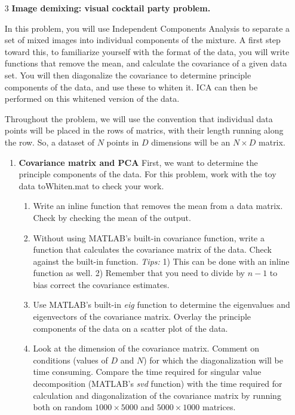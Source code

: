 \documentclass{article}
\begin{document}
\begin{itemize}
\item[3] \textbf{Image demixing: visual cocktail party problem. }

In this problem, you will use Independent Components Analysis to separate a set of mixed images into individual components of the mixture. A first step toward this, to familiarize yourself with the format of the data, you will write functions that remove the mean, and calculate the covariance of a given data set. You will then diagonalize the covariance to determine principle components of the data, and use these to whiten it. ICA can then be performed on this whitened version of the data.

 Throughout the problem, we will use the convention that individual data points will be placed in the rows of matrics, with their length running along the row. So, a dataset of $N$ points in $D$ dimensions will be an $N\times D$ matrix.
\begin{enumerate}[label=\alph*)]
    \item \textbf{ Covariance matrix and PCA} First, we want to determine the principle components of the data. For this problem, work with the toy data toWhiten.mat to check your work.


    \begin{enumerate}[label=(\roman*)]
        \item Write an inline function that removes the mean from a data matrix. Check by checking the mean of the output.
        \item Without using MATLAB's built-in covariance function, write a function that calculates the covariance matrix of the data. Check against the built-in function. \textit{Tips:} 1) This can be done with an inline function as well. 2) Remember that you need to divide by $n-1$ to bias correct the covariance estimates. 
        \item Use MATLAB's built-in \textit{eig} function to determine the eigenvalues and eigenvectors of the covariance matrix. Overlay the principle components of the data on a scatter plot of the data.

        \item Look at the dimension of the covariance matrix. Comment on conditions (values of $D$ and $N$) for which the diagonalization will be time consuming. Compare the time required for singular value decomposition (MATLAB's \textit{svd} function) with the time required for calculation and diagonalization of the covariance matrix by running both on random $1000\times 5000$ and $5000 \times1000$ matrices.


\end{enumerate}
\end{enumerate}
\end{itemize}
\end{document}
